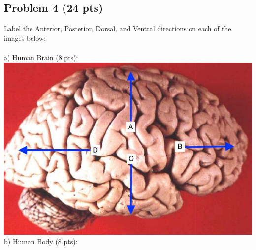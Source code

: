 \documentclass{article}
\begin{document}
\subsection*{Problem 4 (24 pts)}
Label the Anterior, Posterior, Dorsal, and Ventral directions on each of the images below:
\\\\a) Human Brain (8 pts):\\
\includegraphics[scale = .25]{brain_directions.jpg}
\\b) Human Body (8 pts):\\
\end{document}
